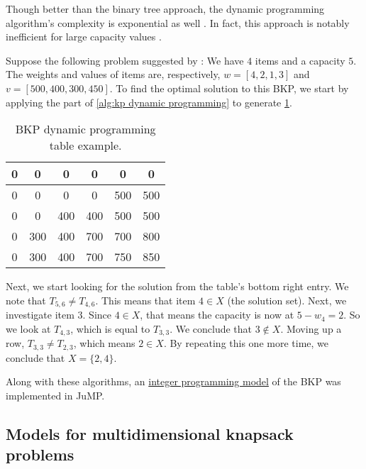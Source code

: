 Though better than the binary tree approach, the dynamic programming algorithm's complexity is exponential as well \cite{FEOFILOFF2020a}. In fact, this approach is notably inefficient for large capacity values \cite{HRISTAKEVA2005}.

\begin{example}
    Suppose the following problem suggested by \textcite{FEOFILOFF2020a}: We have $4$ items and a capacity $5$. The weights and values of items are, respectively, $w = [4, 2, 1, 3]$ and $v = [500, 400, 300, 450]$. To find the optimal solution to this BKP, we start by applying the part of \cref{alg:kp dynamic programming} to generate \cref{tab:kp dynamic programming table}.

    \begin{table}[h]
        \centering
        \begin{tabular}{|c c c c c c|}
            \hline
            0 & 0 & 0 & 0 & 0 & 0\\
            \hline
            0 & 0 & 0 & 0 & 500 & 500\\
            \hline
            0 & 0 & 400 & 400 & 500 & 500\\
            \hline
            0 & 300 & 400 & 700 & 700 & 800\\
            \hline
            0 & 300 & 400 & 700 & 750 & 850\\
            \hline
        \end{tabular}
        \caption{BKP dynamic programming table example.}
        \label{tab:kp dynamic programming table}
    \end{table}

    Next, we start looking for the solution from the table's bottom right entry. We note that $T_{5,6} \neq T_{4,6}$. This means that item $4 \in X$ (the solution set). Next, we investigate item $3$. Since $4 \in X$, that means the capacity is now at $5 - w_4 = 2$. So we look at $T_{4,3}$, which is equal to $T_{3,3}$. We conclude that $3 \notin X$. Moving up a row, $T_{3,3} \neq T_{2,3}$, which means $2 \in X$. By repeating this one more time, we conclude that $X = \{2,4\}$.
\end{example}

Along with these algorithms, an \href{https://github.com/phcentenaro7/IC-Knapsack/blob/main/Knapsack/Misc/1DKP.jl}{integer programming model} of the BKP was implemented in JuMP.

\subsection{Models for multidimensional knapsack problems}

